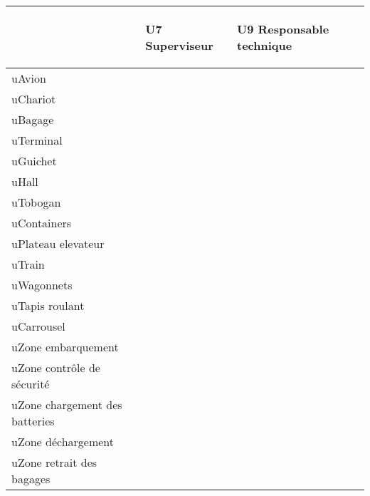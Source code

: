 \providecommand{\DJSPU}[1]{}

\begin {tabular} {| l | l | l |}
\hline
~
&\begin{sideways}U7 Superviseur\end{sideways}
&\begin{sideways}U9 Responsable technique~\end{sideways}\\
\hline
uAvion  & & \\
\hline
uChariot  & & \\
\hline
uBagage  & & \\
\hline
uTerminal  & & \\
\hline
uGuichet  & & \\
\hline
uHall  & & \\
\hline
uTobogan  & & \\
\hline
uContainers  & & \\
\hline
uPlateau elevateur  & & \\
\hline
uTrain  & & \\
\hline
uWagonnets  & & \\
\hline
uTapis roulant  & & \\
\hline
uCarrousel  & & \\
\hline
uZone embarquement  & & \\
\hline
uZone contrôle de sécurité  & & \\
\hline
uZone chargement des batteries  & & \\
\hline
uZone déchargement  & & \\
\hline
uZone retrait des bagages  & & \\
\hline
\end {tabular}

